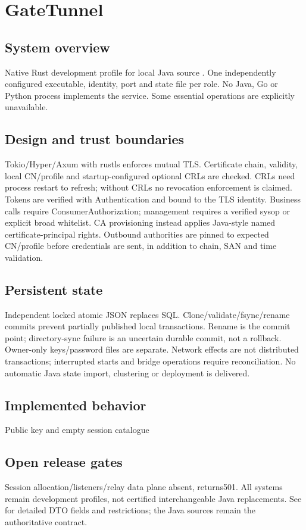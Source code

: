 \documentclass[a4paper]{arrowhead}
\begin{document}
\section{GateTunnel}
\subsection{System overview}
Native Rust development profile for local Java source . One independently configured executable, identity, port and state file per role. No Java, Go or Python process implements the service. Some essential operations are explicitly unavailable.
\subsection{Design and trust boundaries}
Tokio/Hyper/Axum with rustls enforces mutual TLS. Certificate chain, validity, local CN/profile and startup-configured optional CRLs are checked. CRLs need process restart to refresh; without CRLs no revocation enforcement is claimed. Tokens are verified with Authentication and bound to the TLS identity. Business calls require ConsumerAuthorization; management requires a verified sysop or explicit broad whitelist. CA provisioning instead applies Java-style named certificate-principal rights. Outbound authorities are pinned to expected CN/profile before credentials are sent, in addition to chain, SAN and time validation.
\subsection{Persistent state}
Independent locked atomic JSON replaces SQL. Clone/validate/fsync/rename commits prevent partially published local transactions. Rename is the commit point; directory-sync failure is an uncertain durable commit, not a rollback. Owner-only keys/password files are separate. Network effects are not distributed transactions; interrupted starts and bridge operations require reconciliation. No automatic Java state import, clustering or deployment is delivered.
\subsection{Implemented behavior}
Public key and empty session catalogue
\subsection{Open release gates}
Session allocation/listeners/relay data plane absent, returns501. All systems remain development profiles, not certified interchangeable Java replacements. See  for detailed DTO fields and restrictions; the Java sources remain the authoritative contract.
\end{document}
